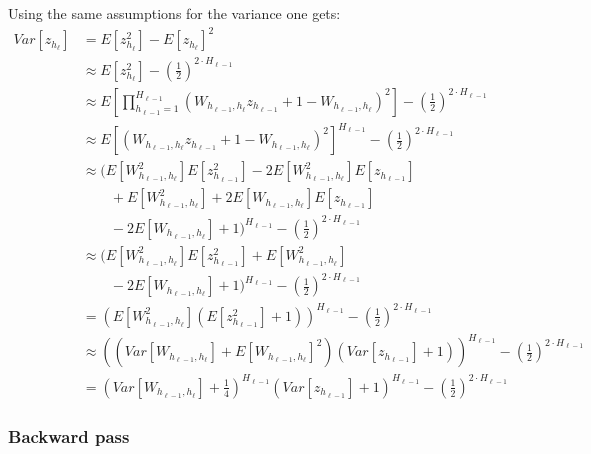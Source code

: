 Using the same assumptions for the variance one gets:
\begin{equation}
\begin{aligned}
Var[z_{h_\ell}] &= E[z_{h_\ell}^2] - E[z_{h_\ell}]^2 \\
&\approx E[z_{h_\ell}^2] - \left(\frac{1}{2}\right)^{2 \cdot H_{\ell-1}} \\
&\approx E\left[\prod_{h_{\ell-1}=1}^{H_{\ell-1}}\left(W_{h_{\ell-1},h_\ell} z_{h_{\ell-1}} + 1 - W_{h_{\ell-1},h_\ell}\right)^2\right] - \left(\frac{1}{2}\right)^{2 \cdot H_{\ell-1}} \\
&\approx E[\left(W_{h_{\ell-1},h_\ell} z_{h_{\ell-1}} + 1 - W_{h_{\ell-1},h_\ell}\right)^2]^{H_{\ell-1}}- \left(\frac{1}{2}\right)^{2 \cdot H_{\ell-1}} \\
&\approx \Big(E[W_{h_{\ell-1},h_\ell}^2] E[z_{h_{\ell-1}}^2] - 2 E[W_{h_{\ell-1},h_\ell}^2] E[z_{h_{\ell-1}}] \\
&\quad\quad+ E[W_{h_{\ell-1},h_\ell}^2] + 2 E[W_{h_{\ell-1},h_\ell}] E[z_{h_{\ell-1}}] \\
&\quad\quad- 2 E[W_{h_{\ell-1},h_\ell}] + 1\Big)^{H_{\ell-1}}- \left(\frac{1}{2}\right)^{2 \cdot H_{\ell-1}} \\
&\approx \Big(E[W_{h_{\ell-1},h_\ell}^2] E[z_{h_{\ell-1}}^2] + E[W_{h_{\ell-1},h_\ell}^2] \\
&\quad\quad- 2 E[W_{h_{\ell-1},h_\ell}] + 1\Big)^{H_{\ell-1}}- \left(\frac{1}{2}\right)^{2 \cdot H_{\ell-1}} \\
&= \left(E[W_{h_{\ell-1},h_\ell}^2] \left(E[z_{h_{\ell-1}}^2] + 1\right)\right)^{H_{\ell-1}}- \left(\frac{1}{2}\right)^{2 \cdot H_{\ell-1}} \\
&\approx \left(\left(Var[W_{h_{\ell-1},h_\ell}] + E[W_{h_{\ell-1},h_\ell}]^2\right) \left(Var[z_{h_{\ell-1}}] + 1\right)\right)^{H_{\ell-1}}- \left(\frac{1}{2}\right)^{2 \cdot H_{\ell-1}} \\
&= \left(Var[W_{h_{\ell-1},h_\ell}] + \frac{1}{4}\right)^{H_{\ell-1}} \left(Var[z_{h_{\ell-1}}] + 1\right)^{H_{\ell-1}} - \left(\frac{1}{2}\right)^{2 \cdot H_{\ell-1}}
\end{aligned}
\end{equation}

\subsubsection{Backward pass}

